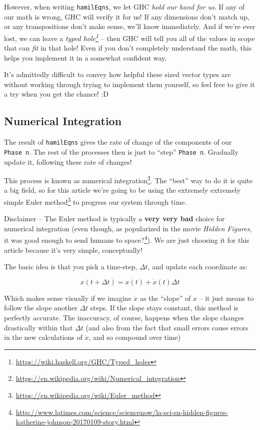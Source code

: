 \documentclass[]{article}
\renewcommand{\href}[2]{#2\footnote{\url{#1}}}
\begin{document}
However, when writing \texttt{hamilEqns}, we let GHC \emph{hold our hand for
us}. If any of our math is wrong, GHC will verify it for us! If any dimensions
don't match up, or any transpositions don't make sense, we'll know immediately.
And if we're ever lost, we can leave a
\emph{\href{https://wiki.haskell.org/GHC/Typed_holes}{typed hole}} -- then GHC
will tell you all of the values in scope that can \emph{fit} in that hole! Even
if you don't completely understand the math, this helps you implement it in a
somewhat confident way.

It's admittedly difficult to convey how helpful these sized vector types are
without working through trying to implement them yourself, so feel free to give
it a try when you get the chance! :D

\subsection{Numerical Integration}\label{numerical-integration}

The result of \texttt{hamilEqns} gives the rate of change of the components of
our \texttt{Phase\ n}. The rest of the processes then is just to ``step''
\texttt{Phase\ n}. Gradually update it, following these rate of changes!

This process is known as
\href{https://en.wikipedia.org/wiki/Numerical_integration}{numerical
integration}. The ``best'' way to do it is quite a big field, so for this
article we're going to be using the extremely extremely simple
\href{https://en.wikipedia.org/wiki/Euler_method}{Euler method} to progress our
system through time.

Disclaimer -- The Euler method is typically a \textbf{very very bad} choice for
numerical integration (even though, as popularized in the movie \emph{Hidden
Figures}, it was good enough to
\href{http://www.latimes.com/science/sciencenow/la-sci-sn-hidden-figures-katherine-johnson-20170109-story.html}{send
humans to space?}). We are just choosing it for this article because it's very
simple, conceptually!

The basic idea is that you pick a time-step, \(\Delta t\), and update each
coordinate as:

\[
x(t + \Delta t) = x(t) + \dot{x}(t) \Delta t
\]

Which makes sense visually if we imagine \(\dot{x}\) as the ``slope'' of \(x\)
-- it just means to follow the slope another \(\Delta t\) steps. If the slope
stays constant, this method is perfectly accurate. The inaccuracy, of course,
happens when the slope changes drastically within that \(\Delta t\) (and also
from the fact that small errors cause errors in the new calculations of
\(\dot{x}\), and so compound over time)
\end{document}
